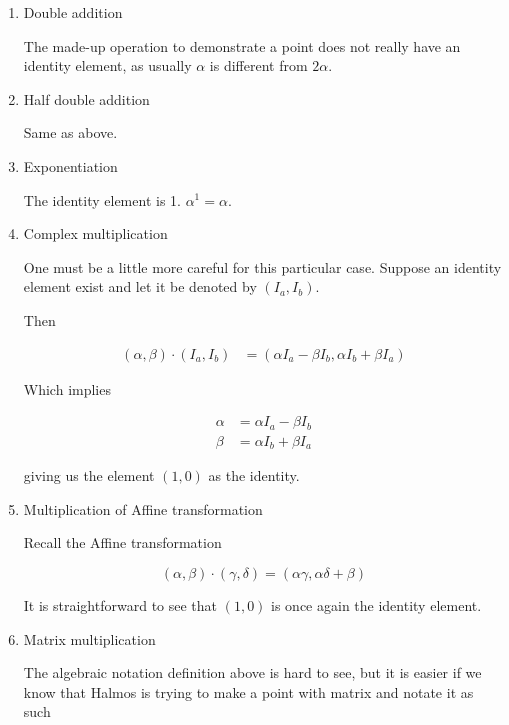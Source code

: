 \begin{enumerate}
    \item Double addition

          The made-up operation to demonstrate a point does not really have an identity element, as usually $\alpha$ is different from $2\alpha$.

    \item Half double addition

          Same as above.

    \item Exponentiation

          The identity element is 1. $\alpha^1 = \alpha$.

    \item Complex multiplication

          One must be a little more careful for this particular case. Suppose an identity element exist and let it be denoted by $(I_a, I_b)$.

          Then

          \begin{align}
              (\alpha, \beta) \boxed{\cdot} (I_a, I_b) & = (\alpha I_a - \beta I_b, \alpha I_b + \beta I_a)
          \end{align}

          Which implies

          \begin{align}
              \alpha & = \alpha I_a - \beta I_b \\
              \beta  & = \alpha I_b + \beta I_a
          \end{align}

          giving us the element $(1,0)$ as the identity.

    \item Multiplication of Affine transformation

          Recall the Affine transformation

          \begin{equation}
              (\alpha, \beta) \boxed{\cdot} (\gamma, \delta) = (\alpha\gamma, \alpha\delta + \beta)
          \end{equation}

          It is straightforward to see that $(1,0)$ is once again the identity element.

    \item Matrix multiplication

          The algebraic notation definition above is hard to see, but it is easier if we know that Halmos is trying to make a point with matrix and notate it as such


\end{enumerate}
